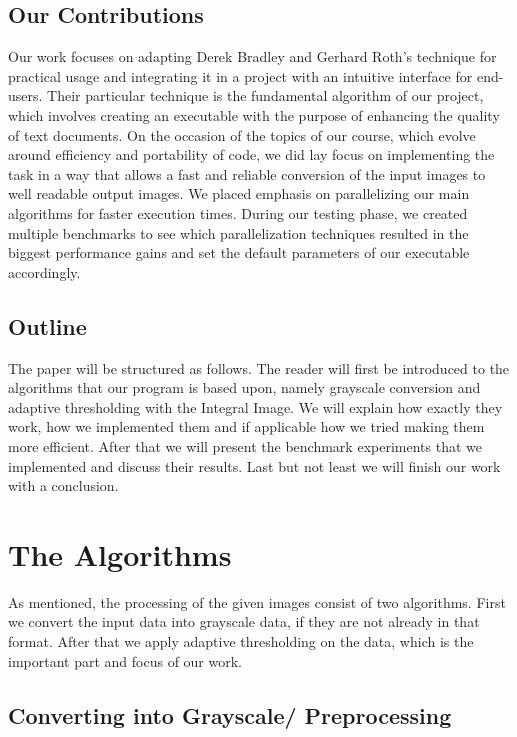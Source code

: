 \documentclass[sigconf]{acmart}
\begin{document}
\subsection{Our Contributions}

Our work focuses on adapting Derek Bradley and Gerhard Roth's technique for practical usage and integrating it in a project with an intuitive interface for end-users. Their particular technique is the fundamental algorithm of our project, which involves creating an executable with the purpose of enhancing the quality of text documents. On the occasion of the topics of our course, which evolve around efficiency and portability of code, we did lay focus on implementing the task in a way that allows a fast and reliable conversion of the input images to well readable output images. We placed emphasis on parallelizing our main algorithms for faster execution times. During our testing phase, we created multiple benchmarks to see which parallelization techniques resulted in the biggest performance gains and set the default parameters of our executable accordingly.

\subsection{Outline}

The paper will be structured as follows. The reader will first be introduced to the algorithms that our program is based upon, namely grayscale conversion and adaptive thresholding with the Integral Image. We will explain how exactly they work, how we implemented them and if applicable how we tried making them more efficient. After that we will present the benchmark experiments that we implemented and discuss their results. Last but not least we will finish our work with a conclusion.

\section{The Algorithms}

As mentioned, the processing of the given images consist of two algorithms. First we convert the input data into grayscale data, if they are not already in that format. After that we apply adaptive thresholding on the data, which is the important part and focus of our work. 

\subsection{Converting into Grayscale/ Preprocessing}
\end{document}
